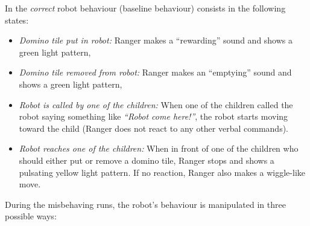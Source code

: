 \documentclass{sig-alternate}
\begin{document}
In the \emph{correct} robot behaviour (baseline behaviour) consists in the
following states:

\begin{itemize}

    \item \emph{Domino tile put in robot:} Ranger makes a ``rewarding'' sound
        and shows a green light pattern,

    \item \emph{Domino tile removed from robot:} Ranger makes an ``emptying''
        sound and shows a green light pattern,

    \item \emph{Robot is called by one of the children:} When one of the
    children called the robot saying something like \textit{``Robot come
    here!''}, the robot starts moving toward the child (Ranger does not react to
    any other verbal commands).

    \item \emph{Robot reaches one of the children:} When in front of one of the
    children who should either put or remove a domino tile, Ranger stops and
    shows a pulsating yellow light pattern. If no reaction, Ranger also makes a
    wiggle-like move.

\end{itemize}

During the misbehaving runs, the robot's behaviour is manipulated in three
possible ways:
\end{document}
